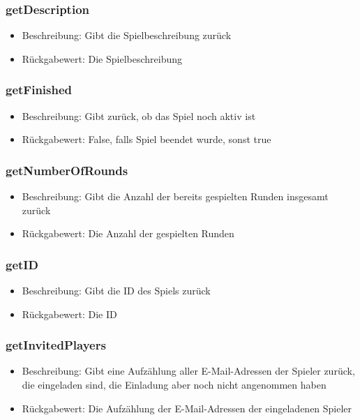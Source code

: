\documentclass[a4paper]{scrreprt}
\begin{document}
    \subsubsection{getDescription}
    \begin{itemize}
        \item Beschreibung: Gibt die Spielbeschreibung zurück
        \item Rückgabewert: Die Spielbeschreibung
    \end{itemize}
    \subsubsection{getFinished}
    \begin{itemize}
        \item Beschreibung: Gibt zurück, ob das Spiel noch aktiv ist
        \item Rückgabewert: False, falls Spiel beendet wurde, sonst true
    \end{itemize}
    \subsubsection{getNumberOfRounds}
    \begin{itemize}
        \item Beschreibung: Gibt die Anzahl der bereits gespielten Runden insgesamt zurück
        \item Rückgabewert: Die Anzahl der gespielten Runden
    \end{itemize}
    \subsubsection{getID}
    \begin{itemize}
        \item Beschreibung: Gibt die ID des Spiels zurück
        \item Rückgabewert: Die ID
    \end{itemize}
    \subsubsection{getInvitedPlayers}
    \begin{itemize}
        \item Beschreibung: Gibt eine Aufzählung aller E-Mail-Adressen der Spieler zurück, die eingeladen sind, die Einladung aber noch nicht angenommen haben
        \item Rückgabewert: Die Aufzählung der E-Mail-Adressen der eingeladenen Spieler
    \end{itemize}
\end{document}
